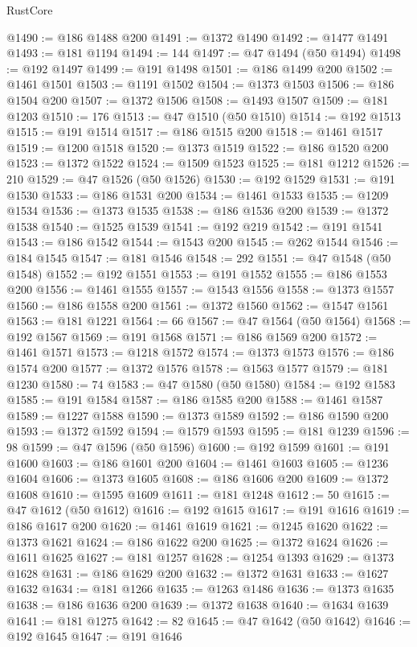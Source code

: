 \begin{lexlean}{RustCore}
\begin{coremodule}
@1490 := @186 @1488 @200
@1491 := @1372 @1490
@1492 := @1477 @1491
@1493 := @181 @1194
@1494 := 144
@1497 := @47 @1494 (@50 @1494)
@1498 := @192 @1497
@1499 := @191 @1498
@1501 := @186 @1499 @200
@1502 := @1461 @1501
@1503 := @1191 @1502
@1504 := @1373 @1503
@1506 := @186 @1504 @200
@1507 := @1372 @1506
@1508 := @1493 @1507
@1509 := @181 @1203
@1510 := 176
@1513 := @47 @1510 (@50 @1510)
@1514 := @192 @1513
@1515 := @191 @1514
@1517 := @186 @1515 @200
@1518 := @1461 @1517
@1519 := @1200 @1518
@1520 := @1373 @1519
@1522 := @186 @1520 @200
@1523 := @1372 @1522
@1524 := @1509 @1523
@1525 := @181 @1212
@1526 := 210
@1529 := @47 @1526 (@50 @1526)
@1530 := @192 @1529
@1531 := @191 @1530
@1533 := @186 @1531 @200
@1534 := @1461 @1533
@1535 := @1209 @1534
@1536 := @1373 @1535
@1538 := @186 @1536 @200
@1539 := @1372 @1538
@1540 := @1525 @1539
@1541 := @192 @219
@1542 := @191 @1541
@1543 := @186 @1542
@1544 := @1543 @200
@1545 := @262 @1544
@1546 := @184 @1545
@1547 := @181 @1546
@1548 := 292
@1551 := @47 @1548 (@50 @1548)
@1552 := @192 @1551
@1553 := @191 @1552
@1555 := @186 @1553 @200
@1556 := @1461 @1555
@1557 := @1543 @1556
@1558 := @1373 @1557
@1560 := @186 @1558 @200
@1561 := @1372 @1560
@1562 := @1547 @1561
@1563 := @181 @1221
@1564 := 66
@1567 := @47 @1564 (@50 @1564)
@1568 := @192 @1567
@1569 := @191 @1568
@1571 := @186 @1569 @200
@1572 := @1461 @1571
@1573 := @1218 @1572
@1574 := @1373 @1573
@1576 := @186 @1574 @200
@1577 := @1372 @1576
@1578 := @1563 @1577
@1579 := @181 @1230
@1580 := 74
@1583 := @47 @1580 (@50 @1580)
@1584 := @192 @1583
@1585 := @191 @1584
@1587 := @186 @1585 @200
@1588 := @1461 @1587
@1589 := @1227 @1588
@1590 := @1373 @1589
@1592 := @186 @1590 @200
@1593 := @1372 @1592
@1594 := @1579 @1593
@1595 := @181 @1239
@1596 := 98
@1599 := @47 @1596 (@50 @1596)
@1600 := @192 @1599
@1601 := @191 @1600
@1603 := @186 @1601 @200
@1604 := @1461 @1603
@1605 := @1236 @1604
@1606 := @1373 @1605
@1608 := @186 @1606 @200
@1609 := @1372 @1608
@1610 := @1595 @1609
@1611 := @181 @1248
@1612 := 50
@1615 := @47 @1612 (@50 @1612)
@1616 := @192 @1615
@1617 := @191 @1616
@1619 := @186 @1617 @200
@1620 := @1461 @1619
@1621 := @1245 @1620
@1622 := @1373 @1621
@1624 := @186 @1622 @200
@1625 := @1372 @1624
@1626 := @1611 @1625
@1627 := @181 @1257
@1628 := @1254 @1393
@1629 := @1373 @1628
@1631 := @186 @1629 @200
@1632 := @1372 @1631
@1633 := @1627 @1632
@1634 := @181 @1266
@1635 := @1263 @1486
@1636 := @1373 @1635
@1638 := @186 @1636 @200
@1639 := @1372 @1638
@1640 := @1634 @1639
@1641 := @181 @1275
@1642 := 82
@1645 := @47 @1642 (@50 @1642)
@1646 := @192 @1645
@1647 := @191 @1646

\end{coremodule}
\end{lexlean}
